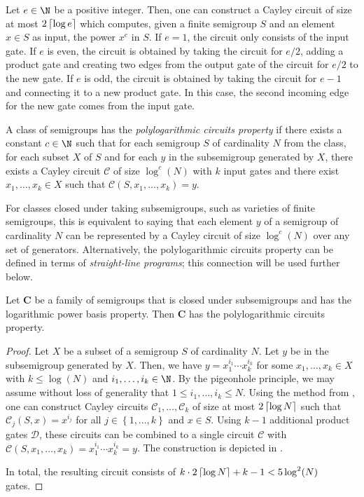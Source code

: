 \documentclass{toc}
\renewcommand{\leq}{\leqslant}
\renewcommand{\le}{\leq}
\newcommand{\ceil}[1]{\ensuremath\left\lceil#1\right\rceil}
\newcommand{\os}[1]{\ensuremath{\left\{#1\right\}}}
\newcommand{\vC}{\mathbf{C}}
\renewcommand{\C}{\ensuremath{\mathcal{C}}}
\newcommand{\SLPBP}{logarithmic power basis property}
\newcommand{\SPLCP}{polylogarithmic circuits property}
\begin{document}
%
%
\begin{example}   %
  Let $e \in \N$ be a positive integer.
  Then, one can construct a Cayley circuit of size at most $2\ceil{\log e}$
  which computes, given a finite semigroup $S$ and an element $x \in S$ as
  input, the power $x^e$ in $S$.
  If $e = 1$, the circuit only consists of the input gate.
  If $e$ is even, the circuit is obtained by taking the circuit for $e/2$,
  adding a product gate and creating two edges from the output gate of the
  circuit for $e/2$ to the new gate.
  If $e$ is odd, the circuit is obtained by taking the circuit for $e-1$ and
  connecting it to a new product gate. In this case, the second incoming edge
  for the new gate comes from the input gate.
  \label{ex:power}
\end{example}

%
A class of semigroups has the \emph{\SPLCP} if there exists a constant $c \in
\N$ such that for each semigroup $S$ of cardinality $N$ from the class, for
each subset $X$ of $S$ and for each $y$ in the subsemigroup generated by $X$,
there exists a Cayley circuit $\C$ of size $\log^c(N)$ with $k$ input gates and
there exist $x_1, \dots, x_k \in X$ such that $\C(S, x_1, \dots, x_k) = y$.

For classes closed under taking subsemigroups, such as varieties of finite
semigroups, this is equivalent to saying that each element $y$ of a semigroup
of cardinality $N$ can be represented by a Cayley circuit of size $\log^c(N)$
over any set of generators.
%
Alternatively, the {\SPLCP} can be defined in terms of \emph{straight-line
programs}; this connection will be used further below.

\begin{proposition}
  Let $\vC$ be a family of semigroups that is closed under subsemigroups and
  has the {\SLPBP}. Then $\vC$ has the {\SPLCP}.
  \label{prop:lpbp-plcp}
\end{proposition}
%
\begin{proof}
  Let $X$ be a subset of a semigroup $S$ of cardinality $N$. Let $y$ be in the
  subsemigroup generated by $X$.
  Then, we have $y = x_1^{i_1} \cdots x_k^{i_k}$ for some $x_1, \dots, x_k \in
  X$  with $k \le \log(N)$ and $i_1, \dots, i_k \in \N$.
  By the pigeonhole principle, we may assume without loss of generality that
  $1 \le i_1, \dots, i_k \le N$.
  Using the method from , one can construct Cayley
  circuits $\C_1, \dots, \C_k$ of size at most $2\ceil{\log N}$ such that
  $\C_j(S, x) = x^{i_j}$ for all $j \in \os{1, \dots, k}$ and $x \in S$. Using
  $k-1$ additional product gates $\mathcal{D}$, these circuits can be combined
  to a single circuit $\C$ with $\C(S, x_1, \dots, x_k) = x_1^{i_1} \cdots
  x_k^{i_k} = y$.
  The construction is depicted in .

  In total, the resulting circuit consists of $k \cdot 2\ceil{\log N} + k - 1 <
  5 \log^2(N)$ gates.
\end{proof}
\end{document}
